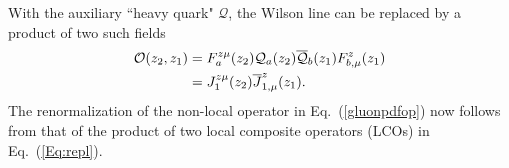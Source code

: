 With the auxiliary ``heavy quark" $\mathcal Q$, the Wilson line can be replaced by a product of two such fields~\cite{Ji:2017oey}
\begin{align}\label{Eq:repl}
{\cal O}(z_2, z_1) &= F_a^{z\mu}(z_2){\mathcal Q}_a(z_2) \overline{\mathcal Q}_b(z_1) F^z_{b, \mu}(z_1)\nonumber\\
&= J_1^{z\mu}(z_2) {\overline J}_{1, \mu}^z(z_1).
\end{align}
The renormalization of the non-local operator in Eq.~(\ref{gluonpdfop}) now follows from that of the product of two local composite operators (LCOs) in Eq.~(\ref{Eq:repl}).
